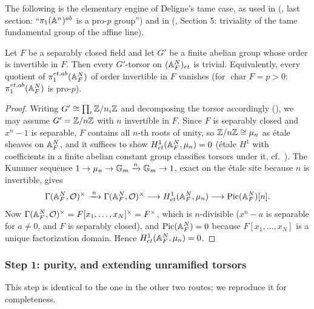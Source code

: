 The following is the elementary engine of Deligne's tame case, as used in
(\cite{tendler2015geometricclassfieldtheory}, last section:
``$\pi_1(\mathbb{A}^n)^{ab}$ is a pro-$p$ group'') and in
(\cite{Guignard2018}, Section 5: triviality of the tame fundamental group of
the affine line).

\begin{lemma}\label{lemma:affine_pro_p_short}
    Let $F$ be a separably closed field and let $G'$ be a finite abelian group whose order
    is invertible in $F$. Then every $G'$-torsor on $(\mathbb{A}^N_F)_{et}$ is trivial.
    Equivalently, every quotient of $\pi_1^{et,ab}(\mathbb{A}^N_F)$ of order invertible in $F$
    vanishes (for $\operatorname{char} F = p > 0$: $\pi_1^{et,ab}(\mathbb{A}^N_F)$ is pro-$p$).
\end{lemma}
\begin{proof}
    Writing $G' \cong \prod_i \mathbb{Z}/n_i\mathbb{Z}$ and decomposing the torsor accordingly
    (), we may assume $G' = \mathbb{Z}/n\mathbb{Z}$ with $n$ invertible in $F$.
    Since $F$ is separably closed and $x^n - 1$ is separable, $F$ contains all $n$-th roots
    of unity, so $\mathbb{Z}/n\mathbb{Z} \cong \mu_n$ as étale sheaves on $\mathbb{A}^N_F$, and it suffices to show
    $H^1_{et}(\mathbb{A}^N_F, \mu_n) = 0$ (étale $H^1$ with coefficients in a finite abelian
    constant group classifies torsors under it, cf.\
    ). The Kummer sequence
    $1 \to \mu_n \to \mathbb{G}_m \xrightarrow{n} \mathbb{G}_m \to 1$, exact on the étale site because
    $n$ is invertible, gives
    \[
    \Gamma(\mathbb{A}^N_F, \mathcal{O})^\times \xrightarrow{\;n\;} \Gamma(\mathbb{A}^N_F, \mathcal{O})^\times
    \longrightarrow H^1_{et}(\mathbb{A}^N_F, \mu_n) \longrightarrow \operatorname{Pic}(\mathbb{A}^N_F)[n].
    \]
    Now $\Gamma(\mathbb{A}^N_F, \mathcal{O})^\times = F[x_1, \dots, x_N]^\times = F^\times$, which is
    $n$-divisible ($x^n - a$ is separable for $a \neq 0$, and $F$ is separably closed), and
    $\operatorname{Pic}(\mathbb{A}^N_F) = 0$ because $F[x_1,\dots,x_N]$ is a unique factorization domain. Hence
    $H^1_{et}(\mathbb{A}^N_F, \mu_n) = 0$.
\end{proof}

\subsubsection*{Step 1: purity, and extending unramified torsors}

This step is identical to the one in the other two routes; we reproduce it for
completeness.

